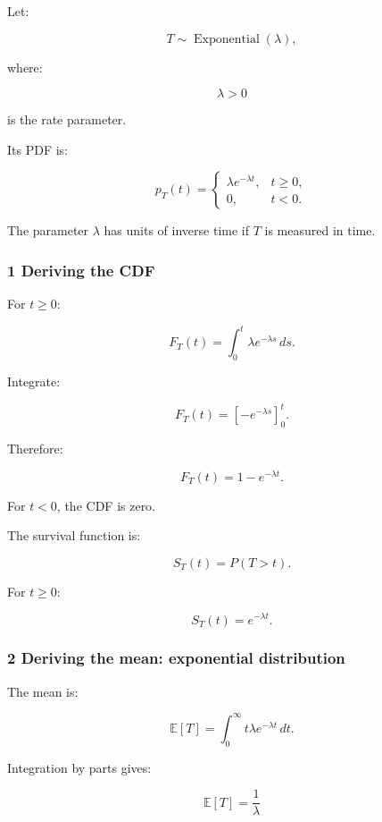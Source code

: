 Let:

\[
 T\sim\operatorname{Exponential}(\lambda),
\]

where:

\[
 \lambda>0
\]

is the rate parameter.

Its PDF is:

\[
 \boxed{ p_T(t)= \begin{cases} \lambda e^{-\lambda t},&t\ge0,\\ 0,&t<0. \end{cases} }
\]

The parameter \(\lambda\) has units of inverse time if \(T\) is measured in time.

\subsubsection{1 Deriving the CDF}\label{02-foundations-ii-ch024-deriving-the-cdf}

\hypertarget{02-foundations-ii-ch024-deriving-the-cdf}{}

For \(t\ge0\):

\[
 F_T(t)= \int_0^t\lambda e^{-\lambda s}\,ds.
\]

Integrate:

\[
 F_T(t)= \left[-e^{-\lambda s}\right]_0^t.
\]

Therefore:

\[
 \boxed{ F_T(t)=1-e^{-\lambda t} }.
\]

For \(t<0\), the CDF is zero.

The survival function is:

\[
 S_T(t)=P(T>t).
\]

For \(t\ge0\):

\[
 \boxed{ S_T(t)=e^{-\lambda t} }.
\]

\subsubsection{2 Deriving the mean: exponential distribution}\label{02-foundations-ii-ch024-deriving-the-mean-exponential-distribution}

\hypertarget{02-foundations-ii-ch024-deriving-the-mean-exponential-distribution}{}

The mean is:

\[
 \mathbb E[T]= \int_0^\infty t\lambda e^{-\lambda t}\,dt.
\]

Integration by parts gives:

\[
 \mathbb E[T] = \frac1\lambda
\]

